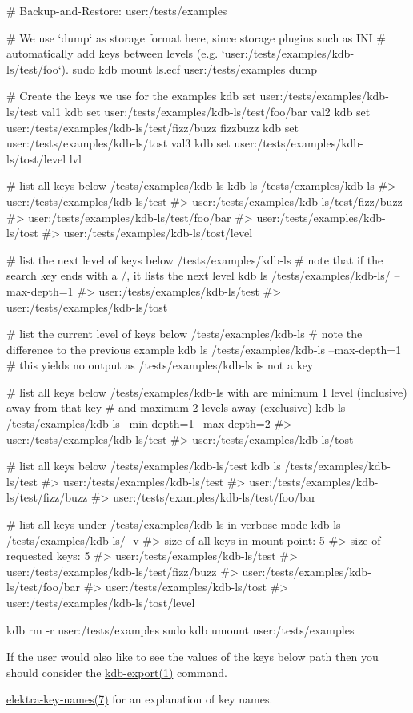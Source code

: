\begin{DoxyCode}
# Backup-and-Restore: user:/tests/examples

# We use `dump` as storage format here, since storage plugins such as INI
# automatically add keys between levels (e.g. `user:/tests/examples/kdb-ls/test/foo`).
sudo kdb mount ls.ecf user:/tests/examples dump

# Create the keys we use for the examples
kdb set user:/tests/examples/kdb-ls/test val1
kdb set user:/tests/examples/kdb-ls/test/foo/bar val2
kdb set user:/tests/examples/kdb-ls/test/fizz/buzz fizzbuzz
kdb set user:/tests/examples/kdb-ls/tost val3
kdb set user:/tests/examples/kdb-ls/tost/level lvl

# list all keys below /tests/examples/kdb-ls
kdb ls /tests/examples/kdb-ls
#> user:/tests/examples/kdb-ls/test
#> user:/tests/examples/kdb-ls/test/fizz/buzz
#> user:/tests/examples/kdb-ls/test/foo/bar
#> user:/tests/examples/kdb-ls/tost
#> user:/tests/examples/kdb-ls/tost/level

# list the next level of keys below /tests/examples/kdb-ls
# note that if the search key ends with a /, it lists the next level
kdb ls /tests/examples/kdb-ls/ --max-depth=1
#> user:/tests/examples/kdb-ls/test
#> user:/tests/examples/kdb-ls/tost

# list the current level of keys below /tests/examples/kdb-ls
# note the difference to the previous example
kdb ls /tests/examples/kdb-ls --max-depth=1
# this yields no output as /tests/examples/kdb-ls is not a key

# list all keys below /tests/examples/kdb-ls with are minimum 1 level (inclusive) away from that key
# and maximum 2 levels away (exclusive)
kdb ls /tests/examples/kdb-ls --min-depth=1 --max-depth=2
#> user:/tests/examples/kdb-ls/test
#> user:/tests/examples/kdb-ls/tost

# list all keys below /tests/examples/kdb-ls/test
kdb ls /tests/examples/kdb-ls/test
#> user:/tests/examples/kdb-ls/test
#> user:/tests/examples/kdb-ls/test/fizz/buzz
#> user:/tests/examples/kdb-ls/test/foo/bar

# list all keys under /tests/examples/kdb-ls in verbose mode
kdb ls /tests/examples/kdb-ls/ -v
#> size of all keys in mount point: 5
#> size of requested keys: 5
#> user:/tests/examples/kdb-ls/test
#> user:/tests/examples/kdb-ls/test/fizz/buzz
#> user:/tests/examples/kdb-ls/test/foo/bar
#> user:/tests/examples/kdb-ls/tost
#> user:/tests/examples/kdb-ls/tost/level

kdb rm -r user:/tests/examples
sudo kdb umount user:/tests/examples
\end{DoxyCode}



\begin{DoxyItemize}
\item If the user would also like to see the values of the keys below {\ttfamily path} then you should consider the \hyperlink{doc_help_kdb-export_md}{kdb-\/export(1)} command.
\item \hyperlink{doc_help_elektra-key-names_md}{elektra-\/key-\/names(7)} for an explanation of key names. 
\end{DoxyItemize}